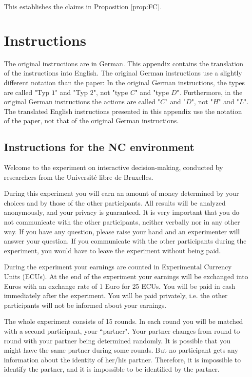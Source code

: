 \documentclass[12pt]{article}
\theoremstyle{break}
\begin{document}
This establishes the claims in Proposition \ref{prop:FC}.

%   
%    
\newpage
\section{Instructions}

The original instructions are in German. This appendix contains the translation of the instructions into English. The original German instructions use a slightly different notation than the paper: In the original German instructions, the types are called "Typ $1$" and "Typ $2$", not "type $C$" and "type $D$". Furthermore, in the original German instructions the actions are called "$C$" and "$D$", not "$H$" and "$L$". The translated English instructions presented in this appendix use the notation of the paper, not that of the original German instructions.

\subsection{Instructions for the NC environment}

Welcome to the experiment on interactive decision-making, conducted by researchers from the Universit\'e libre de Bruxelles.

During this experiment you will earn an amount of money determined by your choices and by those of the other participants. All results will be analyzed anonymously, and your privacy is guaranteed. It is very important that you do not communicate with the other participants, neither verbally nor in any other way. If you have any question, please raise your hand and an experimenter will answer your question. If you communicate with the other participants during the experiment, you would have to leave the experiment without being paid. 

During the experiment your earnings are counted in Experimental Currency Units (ECUs). At the end of the experiment your earnings will be exchanged into Euros with an exchange rate of 1 Euro for 25 ECUs. You will be paid in cash immediately after the experiment. You will be paid privately, i.e. the other participants will not be informed about your earnings.

The whole experiment consists of 15 rounds. In each round you will be matched with a second participant, your ``partner". Your partner changes from round to round with your partner being determined randomly. It is possible that you might have the same partner during some rounds. But no participant gets any information about the identity of her/his partner. Therefore, it is impossible to identify the partner, and it is impossible to be identified by the partner.
\end{document}
